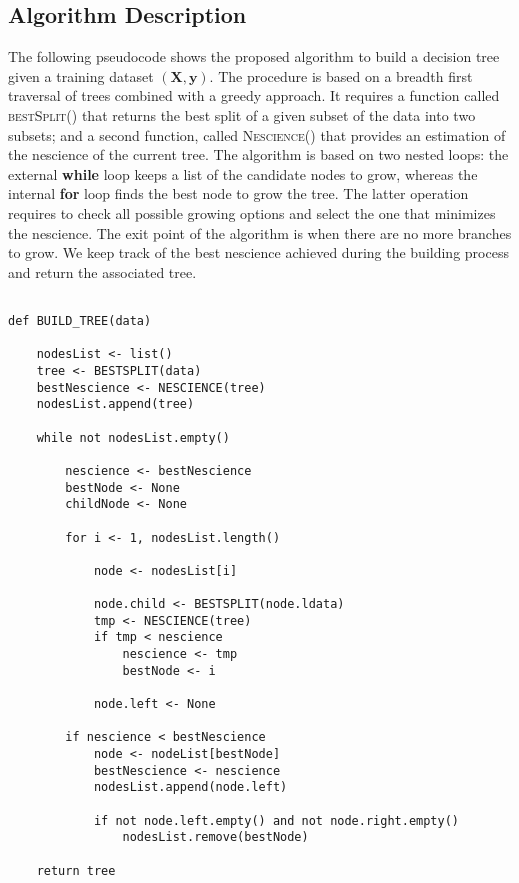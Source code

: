 \subsection{Algorithm Description}
\label{sub:tree_algorithm_description}

The following pseudocode shows the proposed algorithm to build a decision tree given a training dataset $(\mathbf{X}, \mathbf{y})$. The procedure is based on a breadth first traversal of trees combined with a greedy approach. It requires a function called \textsc{bestSplit()} that returns the best split of a given subset of the data into two subsets; and a second function, called \textsc{Nescience()} that provides an estimation of the nescience of the current tree. The algorithm is based on two nested loops: the external \textbf{while} loop keeps a list of the candidate nodes to grow, whereas the internal \textbf{for} loop finds the best node to grow the tree. The latter operation requires to check all possible growing options and select the one that minimizes the nescience. The exit point of the algorithm is when there are no more branches to grow. We keep track of the best nescience achieved during the building process and return the associated tree.

\begin{sourcecode}
\label{algorithm:decision_tree}
{\scriptsize \begin{verbatim}

def BUILD_TREE(data)

    nodesList <- list()
    tree <- BESTSPLIT(data)
    bestNescience <- NESCIENCE(tree)
    nodesList.append(tree)

    while not nodesList.empty()
    
        nescience <- bestNescience
        bestNode <- None
        childNode <- None
        
        for i <- 1, nodesList.length()

            node <- nodesList[i]
            
            node.child <- BESTSPLIT(node.ldata)
            tmp <- NESCIENCE(tree)
            if tmp < nescience
                nescience <- tmp
                bestNode <- i
                
            node.left <- None

        if nescience < bestNescience
            node <- nodeList[bestNode]
            bestNescience <- nescience
            nodesList.append(node.left)
                        
            if not node.left.empty() and not node.right.empty()
                nodesList.remove(bestNode)
    
    return tree
\end{verbatim}}
\end{sourcecode}

